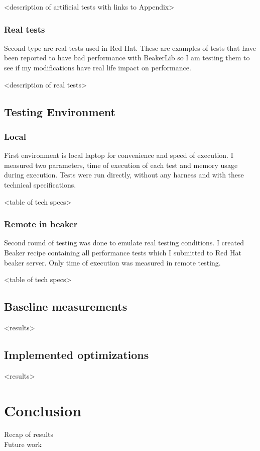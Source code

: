 <description of artificial tests with links to Appendix>

\subsection{Real tests}
Second type are real tests used in Red Hat. These are examples of tests that have been reported to have bad performance with BeakerLib so I am testing them to see if my modifications have real life impact on performance.

<description of real tests>

\section{Testing Environment}

\subsection{Local}
First environment is local laptop for convenience and speed of execution. I measured  two parameters, time of execution of each test and memory usage during execution. Tests were run directly, without any harness and with these technical specifications. 

<table of tech specs>

\subsection{Remote in beaker}
Second round of testing was done to emulate real testing conditions. I created Beaker recipe containing all performance tests which I submitted to Red Hat beaker server. Only time of execution was measured in remote testing.

<table of tech specs>

\section{Baseline measurements}
<results>


\section{Implemented optimizations}
<results>

\chapter{Conclusion}
Recap of results
\\
Future work

